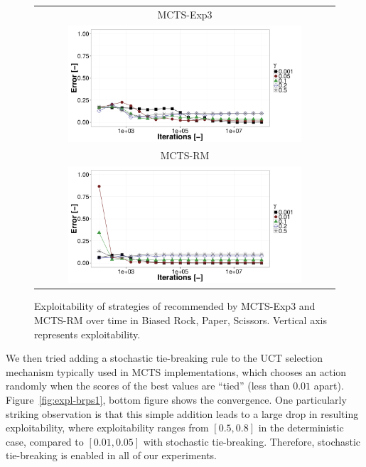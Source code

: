 \begin{figure}[t!]
\centering
\begin{tabular}{c}
{\small MCTS-Exp3} \\
\includegraphics[width=0.8\textwidth]{figures/brps-MCTS-EXP3.pdf} \\
{\small MCTS-RM} \\
\includegraphics[width=0.8\textwidth]{figures/brps-MCTS-RM.pdf} \\
\end{tabular}
\caption{Exploitability of strategies of recommended by MCTS-Exp3 and MCTS-RM over time in Biased Rock, Paper, Scissors. Vertical axis represents exploitability. }
\label{fig:expl-brps2}
\end{figure}

We then tried adding a stochastic tie-breaking rule to the UCT selection mechanism typically used in MCTS implementations, which chooses an 
action randomly when the scores of the best values are ``tied'' (less than $0.01$ apart).
Figure~\ref{fig:expl-brps1}, bottom figure shows the convergence.
One particularly striking observation is that this simple addition leads to a large drop in resulting exploitability, where exploitability
ranges from $[0.5,0.8]$ in the deterministic case, compared to $[0.01,0.05]$ with stochastic tie-breaking. Therefore, stochastic tie-breaking is 
enabled in all of our experiments. 

